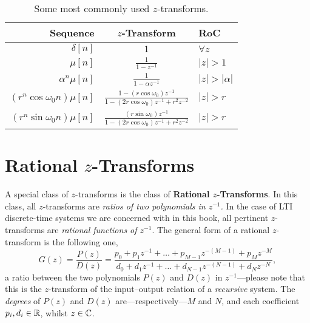 \documentclass[\documentfontsize, twocolumn]{\classname}
\begin{document}
\begin{table}[ht]
\centering
\begin{tabular}{rcl}
    \textbf{Sequence}               & \textbf{$z$-Transform}                                                            & \textbf{RoC} \\
    \hline
    $\delta[n]$                     & $1$                                                                               & $\forall z$ \\
    $\mu[n]$                        & $\displaystyle \frac{1}{1 - z^{-1}}$                                                            & $|z| > 1$ \\
    $\alpha^n\mu[n]$                & $\displaystyle \frac{1}{1 - \alpha z^{-1}}$                                                     & $|z| > |\alpha|$ \\
    $(r^n \cos{\omega_0 n})\mu[n]$  & $\displaystyle \frac{1 - (r\cos{\omega_0})z^{-1}}{1 - (2r \cos{\omega_0}) z^{-1} + r^2 z^{-2}}$  & $|z| > r$ \\
    $(r^n \sin{\omega_0 n})\mu[n]$  & $\displaystyle \frac{(r\sin{\omega_0})z^{-1}}{1 - (2r \cos{\omega_0}) z^{-1} + r^2 z^{-2}}$      & $|z| > r$
\end{tabular}
\caption{Some most commonly used $z$-transforms.}\label{tab:zTransforms}
\end{table}

\section{Rational $z$-Transforms}\label{sec:rationalzTransforms}

A special class of $z$-transforms is the class of \textbf{Rational $z$-Transforms}. In this class, all $z$-transforms are \emph{ratios of two polynomials in $z^{-1}$.} In the case of LTI discrete-time systems we are concerned with in this book, all pertinent $z$-transforms are \emph{rational functions of $z^{-1}$}. The general form of a rational $z$-transform is the following one,
\begin{equation}\label{eqn:rationalzTransform}
    G(z) = \frac{P(z)}{D(z)} =
    \frac{
        p_0 + p_1z^{-1} + \dots + p_{M-1} z^{-(M-1)} + p_M z^{-M}
    } {
        d_0 + d_1z^{-1} + \dots + d_{N-1} z^{-(N-1)} + d_N z^{-N}
    },
\end{equation}
a ratio between the two polynomials $P(z)$ and $D(z)$ in $z^{-1}$---please note that this is the $z$-transform of the input--output relation of a \emph{recursive} system.
The \emph{degrees} of $P(z)$ and $D(z)$ are---respectively---$M$ and $N$, and each coefficient $p_i, d_i \in \mathbb R$, whilst $z \in \mathbb C$.
\end{document}
